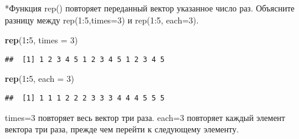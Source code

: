 \documentclass[
]{article}
\newenvironment{Shaded}{\begin{snugshade}}{\end{snugshade}}
\newcommand{\AttributeTok}[1]{\textcolor[rgb]{0.13,0.29,0.53}{#1}}
\newcommand{\DecValTok}[1]{\textcolor[rgb]{0.00,0.00,0.81}{#1}}
\newcommand{\FunctionTok}[1]{\textcolor[rgb]{0.13,0.29,0.53}{\textbf{#1}}}
\newcommand{\NormalTok}[1]{#1}
\newcommand{\SpecialCharTok}[1]{\textcolor[rgb]{0.81,0.36,0.00}{\textbf{#1}}}
\begin{document}
*Функция rep() повторяет переданный вектор указанное число раз.
Объясните разницу между rep(1:5,times=3) и rep(1:5, each=3).

\begin{Shaded}
\begin{Highlighting}[]
\FunctionTok{rep}\NormalTok{(}\DecValTok{1}\SpecialCharTok{:}\DecValTok{5}\NormalTok{, }\AttributeTok{times =} \DecValTok{3}\NormalTok{)}
\end{Highlighting}
\end{Shaded}

\begin{verbatim}
##  [1] 1 2 3 4 5 1 2 3 4 5 1 2 3 4 5
\end{verbatim}

\begin{Shaded}
\begin{Highlighting}[]
\FunctionTok{rep}\NormalTok{(}\DecValTok{1}\SpecialCharTok{:}\DecValTok{5}\NormalTok{, }\AttributeTok{each =} \DecValTok{3}\NormalTok{)}
\end{Highlighting}
\end{Shaded}

\begin{verbatim}
##  [1] 1 1 1 2 2 2 3 3 3 4 4 4 5 5 5
\end{verbatim}

times=3 повторяет весь вектор три раза. each=3 повторяет каждый элемент
вектора три раза, прежде чем перейти к следующему элементу.
\end{document}
